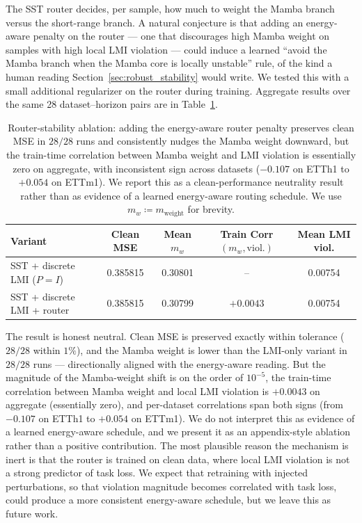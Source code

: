 \documentclass[10pt]{article} %
\theoremstyle{definition}
\begin{document}
The SST router decides, per sample, how much to weight the Mamba branch versus the short-range branch. A natural conjecture is that adding an energy-aware penalty on the router --- one that discourages high Mamba weight on samples with high local LMI violation --- could induce a learned ``avoid the Mamba branch when the Mamba core is locally unstable'' rule, of the kind a human reading Section~\ref{sec:robust_stability} would write. We tested this with a small additional regularizer on the router during training. Aggregate results over the same 28 dataset--horizon pairs are in Table~\ref{tab:router}.

\begin{table}[h]
\centering
\small
\setlength{\tabcolsep}{4pt}
\renewcommand{\arraystretch}{1.15}
\begin{tabular}{@{}l c c c c@{}}
\toprule
\textbf{Variant} & \textbf{Clean MSE} & \textbf{Mean $m_w$} & \textbf{Train Corr$(m_w, \text{viol.})$} & \textbf{Mean LMI viol.}\\
\midrule
SST + discrete LMI ($P=I$)  & 0.385815 & 0.30801 & --        & 0.00754\\
SST + discrete LMI + router & 0.385815 & 0.30799 & $+0.0043$ & 0.00754\\
\bottomrule
\end{tabular}
\caption{Router-stability ablation: adding the energy-aware router penalty preserves clean MSE in $28/28$ runs and consistently nudges the Mamba weight downward, but the train-time correlation between Mamba weight and LMI violation is essentially zero on aggregate, with inconsistent sign across datasets ($-0.107$ on ETTh1 to $+0.054$ on ETTm1). We report this as a clean-performance neutrality result rather than as evidence of a learned energy-aware routing schedule. We use $m_w \coloneqq m_{\text{weight}}$ for brevity.}
\label{tab:router}
\end{table}

The result is honest neutral. Clean MSE is preserved exactly within tolerance ($28/28$ within $1\%$), and the Mamba weight is lower than the LMI-only variant in $28/28$ runs --- directionally aligned with the energy-aware reading. But the magnitude of the Mamba-weight shift is on the order of $10^{-5}$, the train-time correlation between Mamba weight and local LMI violation is $+0.0043$ on aggregate (essentially zero), and per-dataset correlations span both signs (from $-0.107$ on ETTh1 to $+0.054$ on ETTm1). We do not interpret this as evidence of a learned energy-aware schedule, and we present it as an appendix-style ablation rather than a positive contribution. The most plausible reason the mechanism is inert is that the router is trained on clean data, where local LMI violation is not a strong predictor of task loss. We expect that retraining with injected perturbations, so that violation magnitude becomes correlated with task loss, could produce a more consistent energy-aware schedule, but we leave this as future work.
\end{document}
